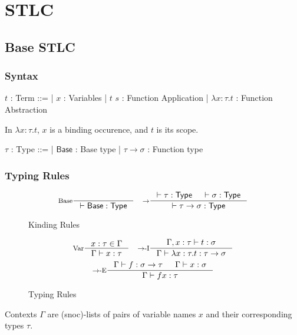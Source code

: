 \documentclass[a4paper]{report}
\newcommand{\Base}[0]{\mathsf{Base}}
\newcommand{\Type}[0]{\mathsf{Type}}
\newcommand{\Intro}[1]{#1-\textrm{I}}
\newcommand{\Elim}[1]{#1-\textrm{E}}
\begin{document}
\tableofcontents
\chapter{STLC}

\section{Base STLC}
\subsection{Syntax}
\begin{bnf}
$t$ : \textsf{Term} ::=
| $x$ : Variables
| $t$ $s$ : Function Application
| $\lambda x \colon \tau. t$ : Function Abstraction
\end{bnf}

\hfill\break
In $\lambda x \colon \tau. t$, $x$ is a binding occurence, and $t$ is its scope.

\noindent
\begin{bnf}
$\tau$ : \textsf{Type} ::=
| $\Base$ : Base type
| $\tau \to \sigma$ : Function type
\end{bnf}

\subsection{Typing Rules}
\begin{figure*}[h]
  \[
    \inference[Base]{}
                    {\vdash \Base : \Type}
    \quad
    \inference[$\to$]{\vdash \tau : \Type & \vdash \sigma : \Type}
                     {\vdash \tau \to \sigma : \Type}
  \]
  
  \caption*{Kinding Rules}
  \label{fig:base-stlc-mltr}
\end{figure*}

\begin{figure*}[h]
  \[
    \inference[Var]{x : \tau \in \Gamma}
                   {\Gamma \vdash x : \tau}
    \quad
    \inference[\Intro{$\to$}]{\Gamma, x : \tau \vdash t : \sigma}
                             {\Gamma \vdash \lambda x : \tau. t : \tau \to \sigma}
  \]
  \[
    \inference[\Elim{$\to$}]{\Gamma \vdash f : \sigma \to \tau & \Gamma \vdash x : \sigma}
                            {\Gamma \vdash f x : \tau}
  \]
  
  \caption*{Typing Rules}
  \label{fig:base-stlc-oltr}
\end{figure*}

Contexts $\Gamma$ are (snoc)-lists of pairs of variable names $x$ and their corresponding types $\tau$.
\end{document}
